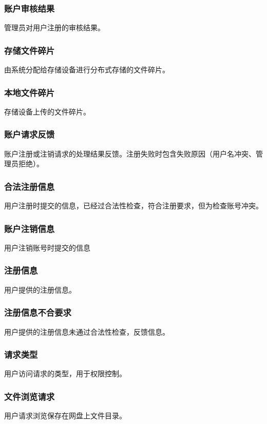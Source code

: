 \subsubsection{账户审核结果}
管理员对用户注册的审核结果。

\subsubsection{存储文件碎片}
由系统分配给存储设备进行分布式存储的文件碎片。

\subsubsection{本地文件碎片}
存储设备上传的文件碎片。

\subsubsection{账户请求反馈}
账户注册或注销请求的处理结果反馈。注册失败时包含失败原因（用户名冲突、管理员拒绝）。

\subsubsection{合法注册信息}
用户注册时提交的信息，已经过合法性检查，符合注册要求，但为检查账号冲突。

\subsubsection{账户注销信息}
用户注销账号时提交的信息

\subsubsection{注册信息}
用户提供的注册信息。

\subsubsection{注册信息不合要求}
用户提供的注册信息未通过合法性检查，反馈信息。

\subsubsection{请求类型}
用户访问请求的类型，用于权限控制。

\subsubsection{文件浏览请求}
用户请求浏览保存在网盘上文件目录。

